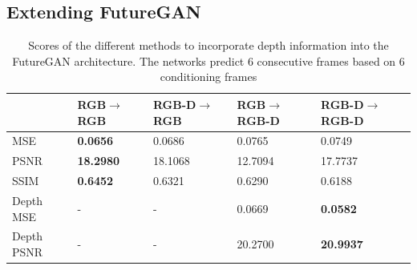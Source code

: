 \documentclass[10pt,twocolumn,letterpaper]{article}
\begin{document}
\subsection{Extending FutureGAN}
\begin{table}[H]
	\centering
	\begin{adjustbox}{max width=0.5\textwidth}
		\begin{tabular}{lllll}
			& RGB$\rightarrow$RGB & RGB-D$\rightarrow$RGB & RGB$\rightarrow$RGB-D & RGB-D$\rightarrow$RGB-D \\ \hline
			MSE        & \textbf{0.0656}       & 0.0686                  & 0.0765                  & 0.0749                    \\
			PSNR       & \textbf{18.2980}      & 18.1068                 & 12.7094                 & 17.7737                   \\
			SSIM       & \textbf{0.6452}       & 0.6321                  & 0.6290                  & 0.6188                    \\
			Depth MSE  & -                     & -                       & 0.0669                  & \textbf{0.0582}           \\
			Depth PSNR & -                     & -                       & 20.2700                 & \textbf{20.9937}          \\ \hline
		\end{tabular}
	\end{adjustbox}
	\caption{Scores of the different methods to incorporate depth information into the FutureGAN architecture. The networks predict 6 consecutive frames based on 6 conditioning frames}
	\label{tab:ablation_scores}
\end{table}
\end{document}
